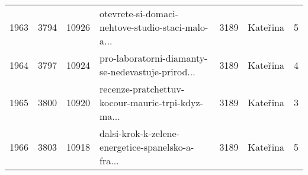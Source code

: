 \begin{tabular}{lrrlrlr}
1963 &       3794 &    10926 &  otevrete-si-domaci-nehtove-studio-staci-malo-a... &     3189 &                     Kateřina &               5 \\
1964 &       3797 &    10924 &  pro-laboratorni-diamanty-se-nedevastuje-prirod... &     3189 &                     Kateřina &               4 \\
1965 &       3800 &    10920 &  recenze-pratchettuv-kocour-mauric-trpi-kdyz-ma... &     3189 &                     Kateřina &               3 \\
1966 &       3803 &    10918 &  dalsi-krok-k-zelene-energetice-spanelsko-a-fra... &     3189 &                     Kateřina &               5 \\
\bottomrule
\end{tabular}
